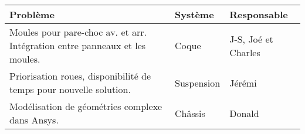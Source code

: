 \begin{tabularx}{\linewidth}{
    |>{\hsize=2.0\hsize}X|%
    >{\hsize=0.5\hsize}X|%
    >{\hsize=0.5\hsize}X|%
  }
    \hline
    \textbf{Problème} & \textbf{Système} & \textbf{Responsable}
    \\\hline
        Moules pour pare-choc av. et arr. Intégration entre panneaux et les moules. & Coque & J-S, Joé et Charles
    \\\hline
        Priorisation roues, disponibilité de temps pour nouvelle solution. & Suspension & Jérémi
    \\\hline
        Modélisation de géométries complexe dans Ansys. & Châssis & Donald
    \\\hline
  \end{tabularx}
    
    
